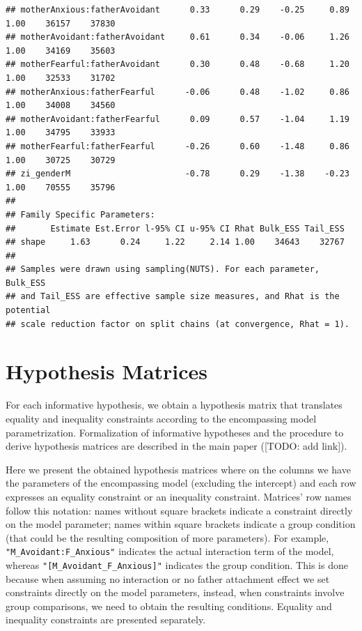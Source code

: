 \documentclass[
]{book}
\begin{document}
\begin{verbatim}
## motherAnxious:fatherAvoidant      0.33      0.29    -0.25     0.89 1.00    36157    37830
## motherAvoidant:fatherAvoidant     0.61      0.34    -0.06     1.26 1.00    34169    35603
## motherFearful:fatherAvoidant      0.30      0.48    -0.68     1.20 1.00    32533    31702
## motherAnxious:fatherFearful      -0.06      0.48    -1.02     0.86 1.00    34008    34560
## motherAvoidant:fatherFearful      0.09      0.57    -1.04     1.19 1.00    34795    33933
## motherFearful:fatherFearful      -0.26      0.60    -1.48     0.86 1.00    30725    30729
## zi_genderM                       -0.78      0.29    -1.38    -0.23 1.00    70555    35796
## 
## Family Specific Parameters: 
##       Estimate Est.Error l-95% CI u-95% CI Rhat Bulk_ESS Tail_ESS
## shape     1.63      0.24     1.22     2.14 1.00    34643    32767
## 
## Samples were drawn using sampling(NUTS). For each parameter, Bulk_ESS
## and Tail_ESS are effective sample size measures, and Rhat is the potential
## scale reduction factor on split chains (at convergence, Rhat = 1).
\end{verbatim}

\hypertarget{hypothesis-matrices}{%
\section{Hypothesis Matrices}\label{hypothesis-matrices}}

For each informative hypothesis, we obtain a hypothesis matrix that translates equality and inequality constraints according to the encompassing model parametrization. Formalization of informative hypotheses and the procedure to derive hypothesis matrices are described in the main paper ({[}TODO: add link{]}).

Here we present the obtained hypothesis matrices where on the columns we have the parameters of the encompassing model (excluding the intercept) and each row expresses an equality constraint or an inequality constraint. Matrices' row names follow this notation: names without square brackets indicate a constraint directly on the model parameter; names within square brackets indicate a group condition (that could be the resulting composition of more parameters). For example, \texttt{"M\_Avoidant:F\_Anxious"} indicates the actual interaction term of the model, whereas \texttt{"{[}M\_Avoidant\_F\_Anxious{]}"} indicates the group condition. This is done because when assuming no interaction or no father attachment effect we set constraints directly on the model parameters, instead, when constraints involve group comparisons, we need to obtain the resulting conditions. Equality and inequality constraints are presented separately.
\end{document}
